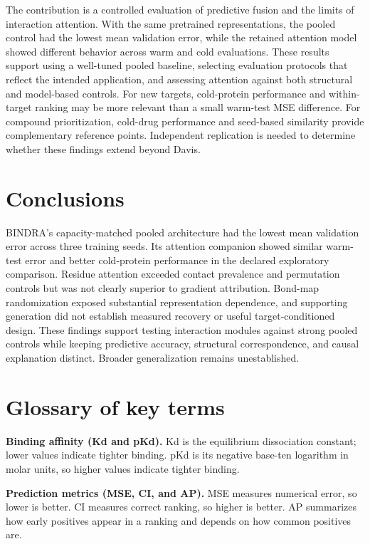 \documentclass[12pt,a4paper]{article}
\begin{document}
The contribution is a controlled evaluation of predictive fusion and the limits of interaction attention. With the same pretrained representations, the pooled control had the lowest mean validation error, while the retained attention model showed different behavior across warm and cold evaluations. These results support using a well-tuned pooled baseline, selecting evaluation protocols that reflect the intended application, and assessing attention against both structural and model-based controls. For new targets, cold-protein performance and within-target ranking may be more relevant than a small warm-test MSE difference. For compound prioritization, cold-drug performance and seed-based similarity provide complementary reference points. Independent replication is needed to determine whether these findings extend beyond Davis.

\section*{Conclusions}
BINDRA's capacity-matched pooled architecture had the lowest mean validation error across three training seeds. Its attention companion showed similar warm-test error and better cold-protein performance in the declared exploratory comparison. Residue attention exceeded contact prevalence and permutation controls but was not clearly superior to gradient attribution. Bond-map randomization exposed substantial representation dependence, and supporting generation did not establish measured recovery or useful target-conditioned design. These findings support testing interaction modules against strong pooled controls while keeping predictive accuracy, structural correspondence, and causal explanation distinct. Broader generalization remains unestablished.

\section*{Glossary of key terms}
\textbf{Binding affinity (Kd and pKd).} Kd is the equilibrium dissociation constant; lower values indicate tighter binding. pKd is its negative base-ten logarithm in molar units, so higher values indicate tighter binding.

\textbf{Prediction metrics (MSE, CI, and AP).} MSE measures numerical error, so lower is better. CI measures correct ranking, so higher is better. AP summarizes how early positives appear in a ranking and depends on how common positives are.
\end{document}
